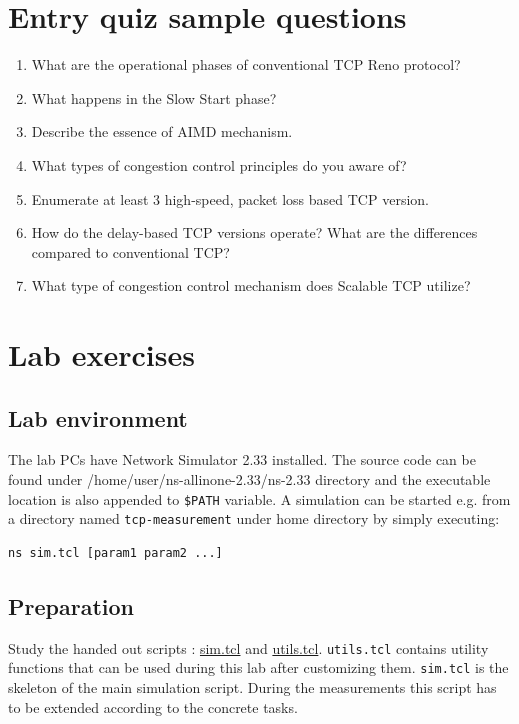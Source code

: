 \documentclass[a4paper]{article}
\begin{document}
\section{Entry quiz sample questions}

\begin{enumerate}
    \item What are the operational phases of conventional TCP Reno protocol?
    \item What happens in the Slow Start phase?
    \item Describe the essence of AIMD mechanism.
    \item What types of congestion control principles do you aware of?
    \item Enumerate at least 3 high-speed, packet loss based TCP version.
    \item How do the delay-based TCP versions operate? What are the differences compared to conventional TCP?
    \item What type of congestion control mechanism does Scalable TCP utilize?
\end{enumerate}

\section{Lab exercises}

\subsection{Lab environment}

The lab PCs have Network Simulator 2.33 installed. The source code can be found
under /home/user/ns-allinone-2.33/ns-2.33 directory and the executable location is also
appended to \verb!$PATH! variable.
A simulation can be started e.g. from a directory named \verb!tcp-measurement! under home directory
by simply executing:

\begin{lstlisting}[language=bash]
ns sim.tcl [param1 param2 ...]
\end{lstlisting}

\subsection{Preparation}

Study the handed out scripts :
\href{https://qosip.tmit.bme.hu/foswiki/pub/Meres/NagysebesseguTCPSzimulaciokFeladatok/sim.tcl}{sim.tcl}
and \href{https://qosip.tmit.bme.hu/foswiki/pub/Meres/NagysebesseguTCPSzimulaciokFeladatok/utils.tcl}{utils.tcl}.
\verb!utils.tcl! contains utility functions that can be used during this lab after customizing them.
\verb!sim.tcl! is the skeleton of the main simulation script. During the measurements this script
has to be extended according to the concrete tasks.
\end{document}

